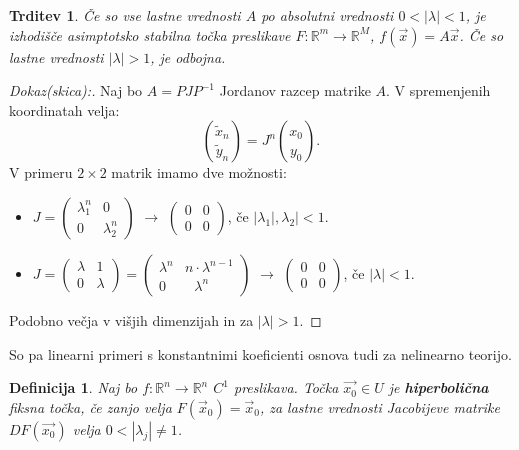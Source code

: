 \documentclass{article}
\newtheorem{definicija}{Definicija}
\newtheorem{trditev}{Trditev}
\newcommand{\R}{\mathbb{R}}
\begin{document}
\begin{trditev}
Če so vse lastne vrednosti $A$ po absolutni vrednosti $0 < |\lambda|< 1$,
je izhodišče asimptotsko stabilna točka preslikave $F: \R^m \rightarrow \R^M$, 
$f(\vec{x}) = A\vec{x}$. Če so lastne vrednosti $|\lambda| > 1$, je 
odbojna.
\end{trditev}

\begin{proof}[Dokaz(skica):]

Naj bo $A = P J P^{-1}$ Jordanov razcep matrike $A$. V spremenjenih 
koordinatah velja:
$$\binom{\tilde{x}_n}{\tilde{y}_n} = J^n \binom{x_0}{y_0}.$$
V primeru $2\times 2$ matrik imamo dve možnosti:
\begin{itemize}
    \item $J = \left(\begin{array}{ll}
    \lambda_1^n & 0 \\ 
    0 & \lambda_2^n
    \end{array}\right)$ $\longrightarrow$ 
    $\left(\begin{array}{ll}
        0 & 0 \\ 
        0 & 0
        \end{array}\right)$, če $|\lambda_1|, \lambda_2| < 1$.
    \item $J = \left(\begin{array}{ll}
    \lambda & 1 \\
    0 & \lambda
    \end{array}\right) = \left(\begin{array}{ll}
        \lambda^n & n\cdot \lambda^{n-1} \\
        0 & \,\,\,\,\lambda^n
        \end{array}\right)$  $\longrightarrow$
    $\left(\begin{array}{ll}
        0 & 0 \\ 
        0 & 0
        \end{array}\right)$, če $|\lambda| < 1$.
\end{itemize}
Podobno večja v višjih dimenzijah in za $|\lambda| > 1$.
\end{proof}

So pa linearni primeri s konstantnimi koeficienti osnova tudi za 
nelinearno teorijo.

\begin{definicija}
Naj bo $f: \R^n \rightarrow \R^n$ $C^1$ preslikava. Točka $\vec{x_0} \in U$
je \textbf{hiperbolična} fiksna točka, če zanjo velja $F(\vec{x}_0) = \vec{x}_0$, 
za lastne vrednosti Jacobijeve matrike $DF(\vec{x_0})$ velja $0<|\lambda_j| \neq 1$.
\end{definicija}
\end{document}
